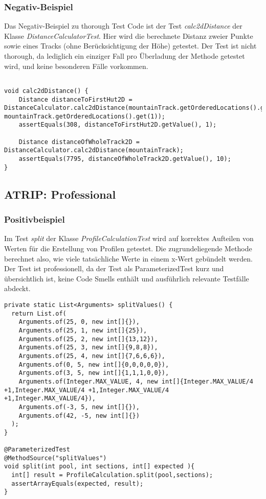 \subsubsection{Negativ-Beispiel}

Das Negativ-Beispiel zu thorough Test Code ist der Test \textit{calc2dDistance} der Klasse \textit{DistanceCalculatorTest}. Hier wird die berechnete Distanz zweier Punkte sowie eines Tracks (ohne Berücksichtigung der Höhe) getestet. 
Der Test ist nicht thorough, da lediglich ein einziger Fall pro Überladung der Methode getestet wird, und keine besonderen Fälle vorkommen.

\begin{lstlisting}

void calc2dDistance() {
	Distance distanceToFirstHut2D = DistanceCalculator.calc2dDistance(mountainTrack.getOrderedLocations().get(0), mountainTrack.getOrderedLocations().get(1));
	assertEquals(308, distanceToFirstHut2D.getValue(), 1);

	Distance distanceOfWholeTrack2D = DistanceCalculator.calc2dDistance(mountainTrack);
	assertEquals(7795, distanceOfWholeTrack2D.getValue(), 10);
}

\end{lstlisting}

\subsection{ATRIP: Professional}

\subsubsection{Positivbeispiel}

 Im Test \textit{split} der Klasse \textit{ProfileCalculationTest} wird auf korrektes Aufteilen von Werten für die Erstellung von Profilen getestet. Die zugrundeliegende Methode berechnet also, wie viele tatsächliche Werte in einem x-Wert gebündelt werden.
Der Test ist professionell, da der Test als ParameterizedTest kurz und übersichtlich ist, keine Code Smells enthält und ausführlich relevante Testfälle abdeckt.

\begin{lstlisting}
private static List<Arguments> splitValues() {
  return List.of(
    Arguments.of(25, 0, new int[]{}),
    Arguments.of(25, 1, new int[]{25}),
    Arguments.of(25, 2, new int[]{13,12}),
    Arguments.of(25, 3, new int[]{9,8,8}),
    Arguments.of(25, 4, new int[]{7,6,6,6}),
    Arguments.of(0, 5, new int[]{0,0,0,0,0}),
    Arguments.of(3, 5, new int[]{1,1,1,0,0}),
    Arguments.of(Integer.MAX_VALUE, 4, new int[]{Integer.MAX_VALUE/4 +1,Integer.MAX_VALUE/4 +1,Integer.MAX_VALUE/4 +1,Integer.MAX_VALUE/4}),
    Arguments.of(-3, 5, new int[]{}),
    Arguments.of(42, -5, new int[]{})
  );
}

@ParameterizedTest
@MethodSource("splitValues")
void split(int pool, int sections, int[] expected ){
  int[] result = ProfileCalculation.split(pool,sections);
  assertArrayEquals(expected, result);
}

\end{lstlisting}

